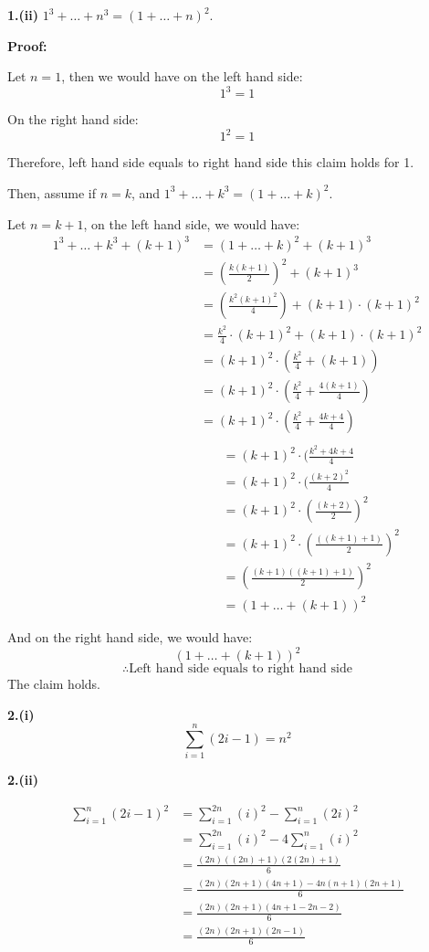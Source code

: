 \documentclass[a4paper,12pt]{report}
\begin{document}
\noindent
\textbf{1.(ii)} $1^3+\dots+n^3=(1+\dots+n)^2$.

\noindent
\textbf{Proof: }

\noindent
Let $n=1$, then we would have on the left hand side:
\[1^3=1\]

\noindent
On the right hand side:
\[1^2=1\]

\noindent
Therefore, left hand side equals to right hand side this claim holds for 1.

\noindent
Then, assume if $n=k$, and $1^3+\dots+k^3=(1+\dots+k)^2$.

\noindent
Let $n=k+1$, on the left hand side, we would have:
\begin{align*}
1^3+\dots+k^3+(k+1)^3
&=(1+\dots+k)^2+(k+1)^3\\
&=(\frac{k(k+1)}{2})^2+(k+1)^3\\
&=(\frac{k^2(k+1)^2}{4})+(k+1)\cdot{(k+1)^2}\\
&=\frac{k^2}{4}\cdot{(k+1)^2}+(k+1)\cdot{(k+1)^2}\\
&=(k+1)^2\cdot{(\frac{k^2}{4}+(k+1))}\\
&=(k+1)^2\cdot{(\frac{k^2}{4}+\frac{4(k+1)}{4})}\\
&=(k+1)^2\cdot{(\frac{k^2}{4}+\frac{4k+4}{4})}\\
\end{align*}
\begin{align*}
\phantom{1^3+\dots+k^3+(k+1)^3}
&=(k+1)^2\cdot{(\frac{k^2+4k+4}{4}}\\
&=(k+1)^2\cdot{(\frac{(k+2)^2}{4}}\\
&=(k+1)^2\cdot{(\frac{(k+2)}{2})^2}\\
&=(k+1)^2\cdot{(\frac{((k+1)+1)}{2})^2}\\
&=(\frac{(k+1)((k+1)+1)}{2})^2\\
&=(1+\dots+(k+1))^2
\end{align*}

\noindent
And on the right hand side, we would have:
\[(1+\dots+(k+1))^2\]
\[\therefore \text{Left hand side equals to right hand side}\]
The claim holds. 

\noindent
\textbf{2.(i)}$$\sum_{i=1}^{n} (2i-1)=n^2$$

\noindent
\textbf{2.(ii)}

\begin{align*}
\sum_{i=1}^{n} (2i-1)^2
&=\sum_{i=1}^{2n} (i)^2-\sum_{i=1}^{n} (2i)^2\\
&=\sum_{i=1}^{2n} (i)^2-4\sum_{i=1}^{n} (i)^2\\
&=\frac{(2n)((2n)+1)(2(2n)+1)}{6}\\
&=\frac{(2n)(2n+1)(4n+1)-4n(n+1)(2n+1)}{6}\\
&=\frac{(2n)(2n+1)(4n+1-2n-2)}{6}\\
&=\frac{(2n)(2n+1)(2n-1)}{6}
\end{align*}
\end{document}
